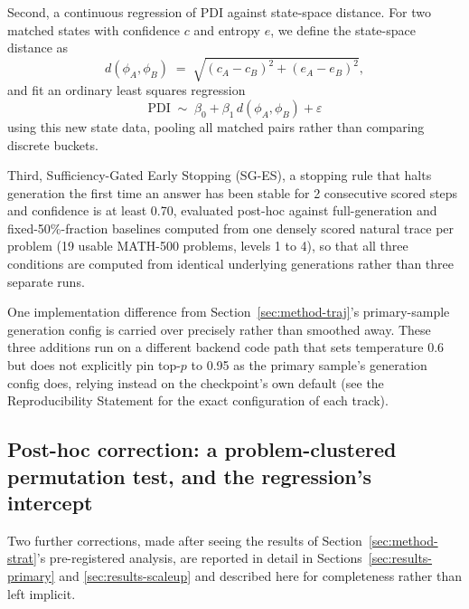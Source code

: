 \documentclass{article}
\begin{document}
Second, a continuous regression of PDI against state-space distance. For two matched states with confidence $c$ and entropy $e$, we define the state-space distance as
\begin{equation}
\label{eq:statedist}
d(\phi_A, \phi_B) \;=\; \sqrt{(c_A - c_B)^2 + (e_A - e_B)^2},
\end{equation}
and fit an ordinary least squares regression
\begin{equation}
\label{eq:regression}
\text{PDI} \;\sim\; \beta_0 + \beta_1 \, d(\phi_A, \phi_B) + \varepsilon
\end{equation}
using this new state data, pooling all matched pairs rather than comparing discrete buckets.

Third, Sufficiency-Gated Early Stopping (SG-ES), a stopping rule that halts generation the first time an answer has been stable for 2 consecutive scored steps and confidence is at least 0.70, evaluated post-hoc against full-generation and fixed-50\%-fraction baselines computed from one densely scored natural trace per problem (19 usable MATH-500 problems, levels 1 to 4), so that all three conditions are computed from identical underlying generations rather than three separate runs.

One implementation difference from Section~\ref{sec:method-traj}'s primary-sample generation config is carried over precisely rather than smoothed away. These three additions run on a different backend code path that sets temperature 0.6 but does not explicitly pin top-$p$ to 0.95 as the primary sample's generation config does, relying instead on the checkpoint's own default (see the Reproducibility Statement for the exact configuration of each track).

\subsection{Post-hoc correction: a problem-clustered permutation test, and the regression's intercept}
\label{sec:method-correction}

Two further corrections, made after seeing the results of Section~\ref{sec:method-strat}'s pre-registered analysis, are reported in detail in Sections~\ref{sec:results-primary} and \ref{sec:results-scaleup} and described here for completeness rather than left implicit.
\end{document}
